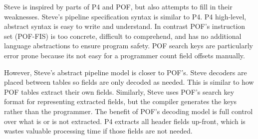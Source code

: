 Steve is inspired by parts of P4 and POF, but also attempts to
fill in their weaknesses. 
Steve's pipeline specification syntax is similar to P4.
P4 high-level, abstract syntax is easy to write and understand. 
In contrast POF's instruction set (POF-FIS) \cite{pof_fis} is too
concrete, difficult to comprehend, and has no additional language
abstractions to ensure program safety.
POF search keys are particularly error prone because its not easy
for a programmer count field offsets manually.

However, Steve's abstract pipeline model is closer to POF's.
Steve decoders are placed between tables so fields are only decoded
as needed. This is similar to how POF tables extract their own fields.
Similarly, Steve uses POF's search key format for representing extracted fields, but the compiler generates the keys rather than the programmer.
The benefit of POF's decoding model is full control over what is or is not
extracted. P4 extracts all header fields up-front, which is wastes 
valuable processing time if those fields are not needed.





